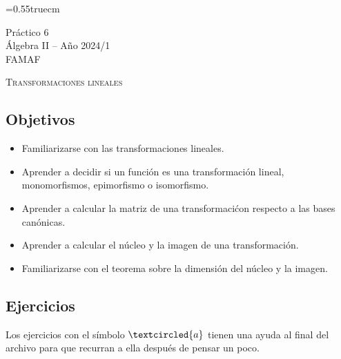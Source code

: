 \documentclass[a4paper,12pt,twoside,spanish,reqno]{amsbook}
\numberwithin{equation}{section}
\begin{document}
    \baselineskip=0.55truecm %

    {\bf \begin{center} Práctico 6 \\ Álgebra  II -- Año 2024/1 \\ FAMAF \end{center}}

    

\centerline{\textsc{Transformaciones lineales}}

\subsection*{Objetivos}

\begin{itemize}
 \item Familiarizarse con las transformaciones lineales.
 \item Aprender a decidir si un función es una transformación lineal, monomorfismos, epimorfismo o isomorfismo.
 \item Aprender a calcular la matriz de una transformaci\'con respecto a las bases canónicas.
 \item Aprender a calcular el núcleo y la imagen de una transformación.

 \item Familiarizarse con el teorema sobre la dimensión del núcleo y la imagen.
\end{itemize}



\subsection*{Ejercicios} Los ejercicios con el símbolo $\textcircled{a}$ tienen una ayuda al final del archivo para que recurran a ella después de pensar un poco.
\end{document}
